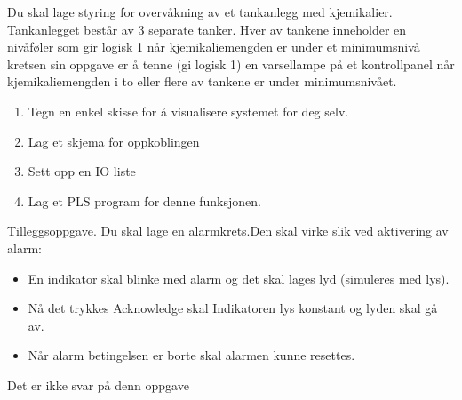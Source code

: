 


Du skal lage styring for overvåkning av et
tankanlegg med kjemikalier. Tankanlegget består av 3 separate tanker.
Hver av tankene inneholder en nivåføler som gir logisk 1 når kjemikaliemengden
er under et minimumsnivå kretsen sin oppgave er å tenne (gi logisk
1) en varsellampe på et kontrollpanel når kjemikaliemengden i to eller
flere av tankene er under minimumsnivået.
\begin{enumerate}
\item Tegn en enkel skisse for å visualisere systemet for deg selv. 
\item Lag et skjema for oppkoblingen
\item Sett opp en IO liste
\item Lag et PLS program for denne funksjonen.
\end{enumerate}

Tilleggsoppgave. Du skal lage en alarmkrets.Den skal virke slik ved aktivering av alarm:
\begin{itemize}
\item En indikator skal blinke med alarm og det skal lages lyd (simuleres
med lys). 
\item Nå det trykkes Acknowledge skal Indikatoren lys konstant og lyden
skal gå av. 
\item Når alarm betingelsen er borte skal alarmen kunne resettes. 
\end{itemize}





Det er ikke svar på denn oppgave













